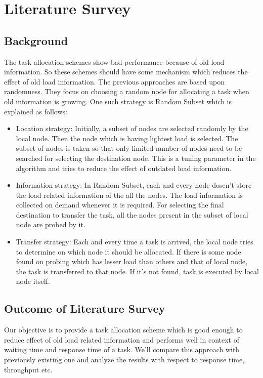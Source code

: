 \documentclass[12pt]{article}
\begin{document}
\clearpage
\section{Literature Survey}
\subsection{Background }
The task allocation schemes show bad performance because of old load information. So these schemes should have some mechanism which reduces the effect of old load information. The previous approaches are based upon randomness. They focus on choosing a random node for allocating a task when old information is growing. One such strategy is Random Subset which is explained as follows:

\begin{itemize}
  \item Location strategy: Initially, a subset of nodes are selected randomly by the local node. Then the node which is having lightest load is selected. The subset of nodes is taken so that only limited number of nodes need to be searched for selecting the destination node. This is a tuning parameter in the algorithm and tries to reduce the effect of outdated load information.
  \item Information strategy: In Random Subset, each and every node dosen’t store the load related information of the all the nodes. The load information is collected on demand whenever it is required. For selecting the final destination to transfer the task, all the nodes present in the subset of local node are probed by it.
  \item Transfer strategy: Each and every time a task is arrived, the local node tries to determine on which node it should be allocated. If there is some node found on probing which has lesser load than others and that of local node, the task is transferred to that node. If it’s not found, task is executed by local node itself.
\end{itemize}


\subsection{Outcome of Literature Survey}
Our objective is to provide a task allocation scheme which is good enough to reduce effect of old load related information and performs well in context of waiting time and response time of a task. We’ll compare this approach with previously existing one and analyze the results with respect to response time, throughput etc.
\end{document}
